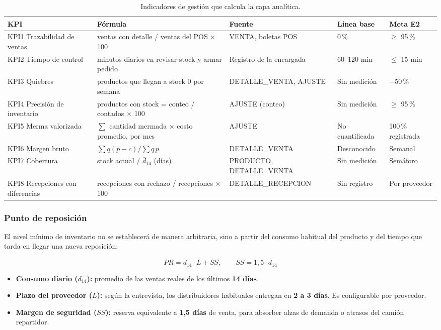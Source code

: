 \documentclass[10pt,a4paper]{article}
\begin{document}
\begin{table}[H]
\centering\small
\begin{tabularx}{\textwidth}{@{}p{2.8cm}Yp{2.8cm}p{1.8cm}p{2.0cm}@{}}
\toprule
\textbf{KPI} & \textbf{Fórmula} & \textbf{Fuente} & \textbf{Línea base} & \textbf{Meta E2} \\
\midrule
KPI1 Trazabilidad de ventas & ventas con detalle / ventas del POS $\times$ 100 & VENTA, boletas POS & 0\,\% & $\ge$ 95\,\% \\
KPI2 Tiempo de control & minutos diarios en revisar stock y armar pedido & Registro de la encargada & 60--120 min & $\le$ 15 min \\
KPI3 Quiebres & productos que llegan a stock 0 por semana & DETALLE\_\allowbreak VENTA, AJUSTE & Sin medición & $-50$\,\% \\
KPI4 Precisión de inventario & productos con stock = conteo / contados $\times$ 100 & AJUSTE (conteo) & Sin medición & $\ge$ 95\,\% \\
KPI5 Merma valorizada & $\sum$ cantidad mermada $\times$ costo promedio, por mes & AJUSTE & No cuantificada & 100\,\% registrada \\
KPI6 Margen bruto & $\sum q(p-c) / \sum q\,p$ & DETALLE\_VENTA & Desconocido & Semanal \\
KPI7 Cobertura & stock actual / $\bar d_{14}$ (días) & PRODUCTO, DETALLE\_VENTA & Sin medición & Semáforo \\
KPI8 Recepciones con diferencias & recepciones con rechazo / recepciones $\times$ 100 & DETALLE\_\allowbreak RECEPCION & Sin registro & Por proveedor \\
\bottomrule
\end{tabularx}
\caption{Indicadores de gestión que calcula la capa analítica.}
\label{tab:kpi}
\end{table}

\subsubsection{Punto de reposición}
\label{sec:pr}

El nivel mínimo de inventario no se establecerá de manera arbitraria, sino a partir del consumo habitual del producto y del tiempo que tarda en llegar una nueva reposición:

\begin{equation}
PR = \bar d_{14}\cdot L + SS, \qquad SS = 1{,}5\cdot \bar d_{14}
\end{equation}

\begin{itemize}
    \item \textbf{Consumo diario ($\bar d_{14}$):} promedio de las ventas reales de los últimos \textbf{14 días}.
    \item \textbf{Plazo del proveedor ($L$):} según la entrevista, los distribuidores habituales entregan en \textbf{2 a 3 días}. Es configurable por proveedor.
    \item \textbf{Margen de seguridad ($SS$):} reserva equivalente a \textbf{1,5 días} de venta, para absorber alzas de demanda o atrasos del camión repartidor.
\end{itemize}
\end{document}
